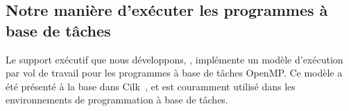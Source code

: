 \documentclass[parallelisme]{compas2016}
\begin{document}






\subsection{Notre manière d'exécuter les programmes à base de tâches}

Le support exécutif que nous développons, \kaapi, implémente un modèle d'exécution par vol
de travail pour les programmes à base de tâches OpenMP. Ce modèle a été présenté
à la base dans Cilk~\cite{cilk5}, et est couramment utilisé dans les environnements
de programmation à base de tâches.
\end{document}
